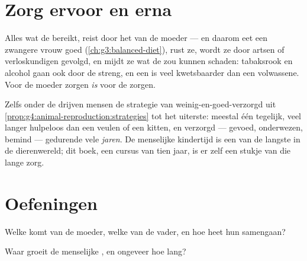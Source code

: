 \section{Zorg ervoor en erna}

\begin{proposition}\label{prop:g5:human-reproduction:care}
Alles wat de  bereikt, reist door het  van de moeder --- en
daarom eet een zwangere vrouw goed (\cref{ch:g3:balanced-diet}), rust ze,
wordt ze door artsen of verloskundigen gevolgd, en mijdt ze wat de 
zou kunnen schaden: tabaksrook en alcohol gaan ook door de streng, en
een  is veel kwetsbaarder dan een volwassene. Voor de moeder
zorgen \emph{is} voor de  zorgen.
\end{proposition}
\admitted

\begin{example}\label{ex:g5:human-reproduction:longcare}
Zelfs onder de  drijven mensen de strategie van
weinig-en-goed-verzorgd uit
\cref{prop:g4:animal-reproduction:strategies} tot het uiterste: meestal
één  tegelijk, veel langer hulpeloos dan een veulen of een kitten,
en verzorgd --- gevoed, onderwezen, bemind --- gedurende vele
\emph{jaren}. De menselijke kindertijd is een van de langste in de
dierenwereld; dit boek, een cursus van tien jaar, is er zelf een stukje
van die lange zorg.
\end{example}

\section{Oefeningen}

\begin{exercise}[$\star$]\label{exo:g5:human-reproduction:1}
Welke  komt van de moeder, welke van de vader, en hoe heet hun
samengaan?
\end{exercise}

\begin{exercise}[$\star$]\label{exo:g5:human-reproduction:2}
Waar groeit de menselijke , en ongeveer hoe lang?
\end{exercise}

